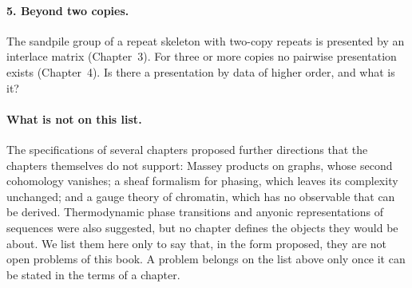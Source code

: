 \paragraph{5. Beyond two copies.} The sandpile group of a repeat skeleton with two-copy repeats is
presented by an interlace matrix (Chapter~3). For three or more copies no pairwise presentation
exists (Chapter~4). Is there a presentation by data of higher order, and what is it?

\paragraph{What is not on this list.} The specifications of several chapters proposed further
directions that the chapters themselves do not support: Massey products on graphs, whose second
cohomology vanishes; a sheaf formalism for phasing, which leaves its complexity unchanged; and a gauge
theory of chromatin, which has no observable that can be derived. Thermodynamic phase transitions and
anyonic representations of sequences were also suggested, but no chapter defines the objects they would
be about. We list them here only to say that, in the form proposed, they are not open problems of this
book. A problem belongs on the list above only once it can be stated in the terms of a chapter.
